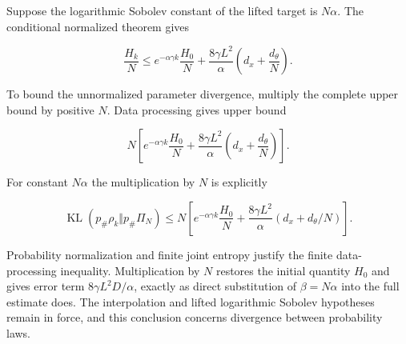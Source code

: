 \documentclass[11pt,a4paper]{article}
\begin{document}
Suppose the logarithmic Sobolev constant of the lifted target is \(N\alpha\). The conditional normalized theorem gives

\[\frac{H_k}{N}\le e^{-\alpha\gamma k}\frac{H_0}{N}+\frac{8\gamma L^2}{\alpha}\left(d_x+\frac{d_\theta}{N}\right).\]

To bound the unnormalized parameter divergence, multiply the complete upper bound by positive \(N\). Data processing gives upper bound

\[N\left[e^{-\alpha\gamma k}\frac{H_0}{N}+\frac{8\gamma L^2}{\alpha}\left(d_x+\frac{d_\theta}{N}\right)\right].\]

For constant \(N\alpha\) the multiplication by \(N\) is explicitly

\[\operatorname{KL}(p_\#\rho_k\Vert p_\#\Pi_N)\le N\left[e^{-\alpha\gamma k}\frac{H_0}{N}+\frac{8\gamma L^2}{\alpha}(d_x+d_\theta/N)\right].\]

Probability normalization and finite joint entropy justify the finite data-processing inequality. Multiplication by \(N\) restores the initial quantity \(H_0\) and gives error term \(8\gamma L^2D/\alpha\), exactly as direct substitution of \(\beta=N\alpha\) into the full estimate does. The interpolation and lifted logarithmic Sobolev hypotheses remain in force, and this conclusion concerns divergence between probability laws.
\end{document}

